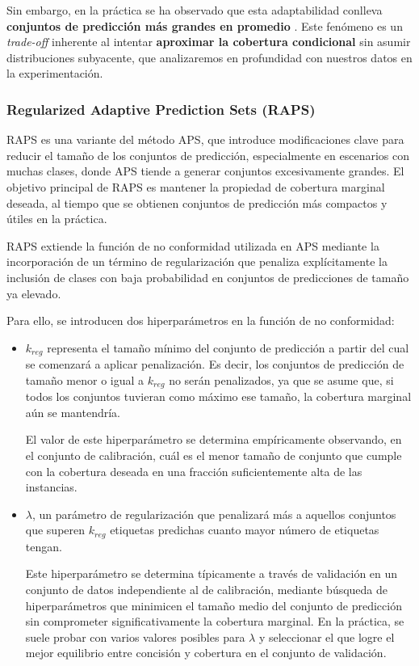 Sin embargo, en la práctica se ha observado que esta adaptabilidad conlleva \textbf{conjuntos de predicción más grandes en promedio} \cite{romano2020, angelopoulos2020}. Este fenómeno es un \textit{trade-off} inherente al intentar \textbf{aproximar la cobertura condicional} sin asumir distribuciones subyacente, que analizaremos en profundidad con nuestros datos en la experimentación. 


\subsubsection{Regularized Adaptive Prediction Sets (RAPS)}

RAPS \cite{angelopoulos2020} es una variante del método APS, que introduce modificaciones clave para reducir el tamaño de los conjuntos de predicción, especialmente en escenarios con muchas clases, donde APS tiende a generar conjuntos excesivamente grandes. El objetivo principal de RAPS es mantener la propiedad de cobertura marginal deseada, al tiempo que se obtienen conjuntos de predicción más compactos y útiles en la práctica. 

RAPS extiende la función de no conformidad utilizada en APS mediante la incorporación de un término de regularización que penaliza explícitamente la inclusión de clases con baja probabilidad en conjuntos de predicciones de tamaño ya elevado. 

Para ello, se introducen dos hiperparámetros en la función de no conformidad:

\begin{itemize}

    \item $k_{reg}$ representa el tamaño mínimo del conjunto de predicción a partir del cual se comenzará a aplicar penalización. Es decir, los conjuntos de predicción de tamaño menor o igual a $k_{reg}$ no serán penalizados, ya que se asume que, si todos los conjuntos tuvieran como máximo ese tamaño, la cobertura marginal aún se mantendría. 
    
    El valor de este hiperparámetro se determina empíricamente observando, en el conjunto de calibración, cuál es el menor tamaño de conjunto que cumple con la cobertura deseada en una fracción suficientemente alta de las instancias. 
   
    \item $\lambda$, un parámetro de regularización que penalizará más a aquellos conjuntos que superen $k_{reg}$ etiquetas predichas cuanto mayor número de etiquetas tengan. 

    Este hiperparámetro se determina típicamente a través de validación en un conjunto de datos independiente al de calibración, mediante búsqueda de hiperparámetros que minimicen el tamaño medio del conjunto de predicción sin comprometer significativamente la cobertura marginal. En la práctica, se suele probar con varios valores posibles para $\lambda$ y seleccionar el que logre el mejor equilibrio entre concisión y cobertura en el conjunto de validación.

\end{itemize}

